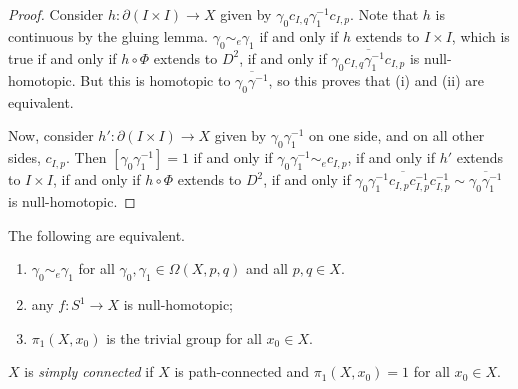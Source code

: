 \begin{proof}
	Consider \( h \colon \partial (I \times I) \to X \) given by \( \gamma_0 c_{I,q} \gamma_1^{-1} c_{I,p} \).
	Note that \( h \) is continuous by the gluing lemma.
	\( \gamma_0 \sim_e \gamma_1 \) if and only if \( h \) extends to \( I \times I \), which is true if and only if \( h \circ \Phi \) extends to \( D^2 \), if and only if \( \overline{\gamma_0 c_{I,q} \gamma_1^{-1} c_{I,p}} \) is null-homotopic.
	But this is homotopic to \( \overline{\gamma_0\gamma^{-1}} \), so this proves that (i) and (ii) are equivalent.

	Now, consider \( h' \colon \partial (I \times I) \to X \) given by \( \gamma_0 \gamma_1^{-1} \) on one side, and on all other sides, \( c_{I,p} \).
	Then \( [\gamma_0\gamma_1^{-1}] = 1 \) if and only if \( \gamma_0 \gamma_1^{-1} \sim_e c_{I,p} \), if and only if \( h' \) extends to \( I \times I \), if and only if \( h \circ \Phi \) extends to \( D^2 \), if and only if \( \overline{\gamma_0\gamma_1^{-1} c_{I,p} c_{I,p}^{-1} c_{I,p}^{-1}} \sim \overline{\gamma_0\gamma_1^{-1}} \) is null-homotopic.
\end{proof}
\begin{corollary}
	The following are equivalent.
	\begin{enumerate}
		\item \( \gamma_0 \sim_e \gamma_1 \) for all \( \gamma_0, \gamma_1 \in \Omega(X,p,q) \) and all \( p,q \in X \).
		\item any \( f \colon S^1 \to X \) is null-homotopic;

		\item \( \pi_1(X,x_0) \) is the trivial group for all \( x_0 \in X \).
	\end{enumerate}
\end{corollary}
\begin{definition}
	\( X \) is \emph{simply connected} if \( X \) is path-connected and \( \pi_1(X,x_0) = 1 \) for all \( x_0 \in X \).
\end{definition}

